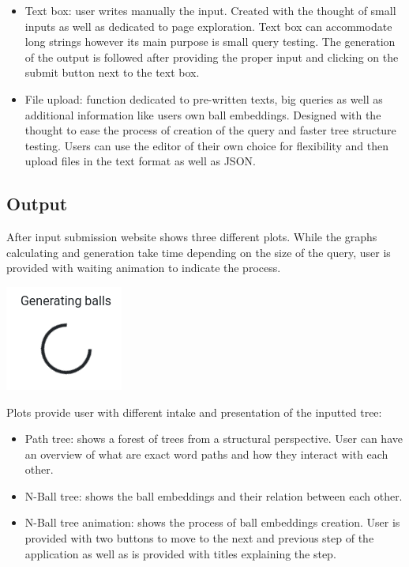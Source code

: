 \documentclass[]{article}
\begin{document}
\begin{itemize}
	\item Text box: user writes manually the input. Created with the thought of small inputs as well as dedicated to page exploration. Text box can accommodate long strings however its main purpose is small query testing. The generation of the output is followed after providing the proper input and clicking on the submit button next to the text box.
	\item  File upload: function dedicated to pre-written texts, big queries as well as additional information like users own ball embeddings. Designed with the thought to ease the process of creation of the query and faster tree structure testing. Users can use the editor of their own choice for flexibility and then upload files in the text format as well as JSON. 
\end{itemize}


\subsection{Output}
After input submission website shows three different plots. While the graphs calculating and generation take time depending on the size of the query, user is provided with waiting animation to indicate the process. 

\begin{center}
	\includegraphics[scale=0.5]{res/waiting.png}
\end{center}

Plots provide user with different intake and presentation of the inputted tree:
\begin{itemize}
	\item Path tree: shows a forest of trees from a structural perspective. User can have an overview of what are exact word paths and how they interact with each other.
	\item N-Ball tree: shows the ball embeddings and their relation between each other.
	\item N-Ball tree animation: shows the process of ball embeddings creation. User is provided with two buttons to move to the next and previous step of the application as well as is provided with titles explaining the step.	
\end{itemize}
\end{document}
